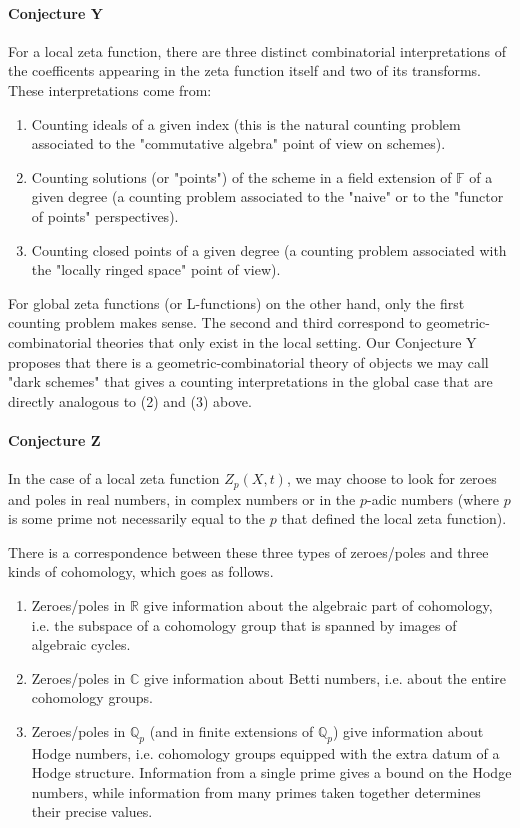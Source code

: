 \documentclass[paper=a4, fontsize=11pt]{scrartcl} %
\numberwithin{equation}{section} %
\numberwithin{figure}{section} %
\numberwithin{table}{section} %
\begin{document}
\paragraph{Conjecture Y}

For a local zeta function, there are three distinct combinatorial interpretations of the coefficents appearing in the zeta function itself and two of its transforms. These interpretations come from:

\begin{enumerate}
\item Counting ideals of a given index (this is the natural counting problem associated to the "commutative algebra" point of view on schemes).
\item Counting solutions (or "points") of the scheme in a field extension of $\mathbb{F}$ of a given degree (a counting problem associated to the "naive" or to the "functor of points" perspectives).
\item Counting closed points of a given degree (a counting problem associated with the "locally ringed space" point of view).
\end{enumerate}

For global zeta functions (or L-functions) on the other hand, only the first counting problem makes sense. The second and third correspond to geometric-combinatorial theories that only exist in the local setting. Our Conjecture Y proposes that there is a geometric-combinatorial theory of objects we may call "dark schemes" that gives a counting interpretations in the global case that are directly analogous to (2) and (3) above.

\paragraph{Conjecture Z}

In the case of a local zeta function $Z_p(X, t)$, we may choose to look for zeroes and poles in real numbers, in complex numbers or in the $p$-adic numbers (where $p$ is some prime not necessarily equal to the $p$ that defined the local zeta function).

There is a correspondence between these three types of zeroes/poles and three kinds of cohomology, which goes as follows.

\begin{enumerate}
\item Zeroes/poles in $\mathbb{R}$ give information about the algebraic part of cohomology, i.e. the subspace of a cohomology group that is spanned by images of algebraic cycles.
\item Zeroes/poles in $\mathbb{C}$ give information about Betti numbers, i.e. about the entire cohomology groups.
\item Zeroes/poles in $\mathbb{Q}_p$ (and in finite extensions of $\mathbb{Q}_p$) give information about Hodge numbers, i.e. cohomology groups equipped with the extra datum of a Hodge structure. Information from a single prime gives a bound on the Hodge numbers, while information from many primes taken together determines their precise values.
\end{enumerate}
\end{document}
